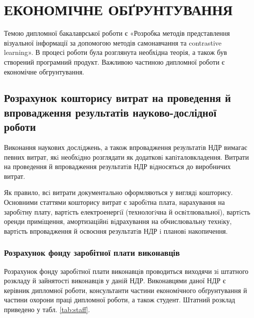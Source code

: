 \section{ЕКОНОМІЧНЕ ОБҐРУНТУВАННЯ}

Темою дипломної бакалаврської роботи є «Розробка методів представлення візуальної інформації за допомогою методів самонавчання та contrastive learning». В процесі роботи була розглянута необхідна теорія, а також був створений програмний продукт. Важливою частиною дипломної роботи є економічне обгрунтування.

\subsection{Розрахунок кошторису витрат на проведення й впровадження результатів науково-дослідної роботи}
Виконання наукових дослiджень, а також впровадження результатiв НДР вимагає певних витрат, якi необхiдно розглядати як додатковi капiталовкладення. Витрати на проведення й впровадження результатiв НДР вiдносяться до виробничих витрат. 

Як правило, всi витрати документально оформляються у виглядi кошторису. Основними статтями кошторису витрат є заробiтна плата, нарахування на заробiтну плату, вартiсть електроенергiї (технологiчна й освiтлювальної), вартiсть оренди примiщення, амортизацiйнi вiдрахування на обчислювальну технiку, вартiсть впровадження й освоєння результатiв НДР i плановi накопичення.

\subsubsection{Розрахунок фонду заробітної плати виконавців}
Розрахунок фонду заробiтної плати виконавцiв проводиться виходячи зi штатного розкладу й зайнятостi виконавцiв у данiй НДР.
Виконавцями даної НДР є керівник дипломної роботи, консультанти частини економічного обґрунтування й частини охорони праці дипломної роботи, а також студент. Штатний розклад приведено у табл. \ref{tab:staff}.

\newpage


